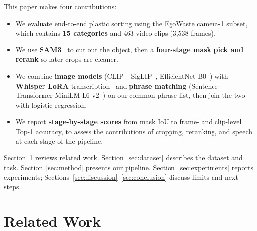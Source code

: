 \documentclass[conference]{IEEEtran}
\begin{document}
This paper makes four contributions:
\begin{itemize}
\item We evaluate end-to-end plastic sorting using the EgoWaste camera-1 subset, which contains \textbf{15 categories} and 463 video clips (3{,}538 frames).
\item We use \textbf{SAM3}~\cite{carion2025sam3} to cut out the object, then a \textbf{four-stage mask pick and rerank} so later crops are cleaner.
\item We combine \textbf{image models} (CLIP~\cite{radford2021learning}, SigLIP~\cite{zhai2023siglip}, EfficientNet-B0~\cite{tan2019efficientnet}) with \textbf{Whisper LoRA} transcription~\cite{radford2023whisper,hu2022lora} and \textbf{phrase matching} (Sentence Transformer MiniLM-L6-v2~\cite{reimers2019sentence}) on our common-phrase list, then join the two with logistic regression.
\item We report \textbf{stage-by-stage scores} from mask IoU to frame- and clip-level Top-1 accuracy, to assess the contributions of cropping, reranking, and speech at each stage of the pipeline.
\end{itemize}

Section~\ref{sec:related} reviews related work.
Section~\ref{sec:dataset} describes the dataset and task.
Section~\ref{sec:method} presents our pipeline.
Section~\ref{sec:experiments} reports experiments; Sections~\ref{sec:discussion}--\ref{sec:conclusion} discuss limits and next steps.

\section{Related Work}
\label{sec:related}
\end{document}
